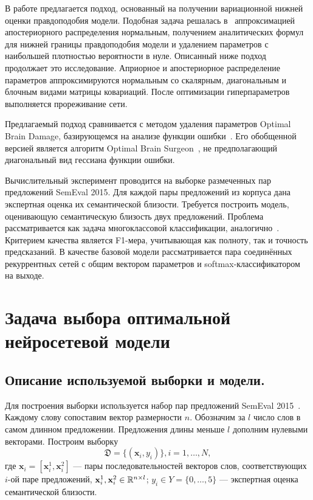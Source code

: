\documentclass[12pt, fleqn, unicode]{article}
\newcommand{\DD}{{\mathfrak{D}}}
\newcommand{\bx}{{\textbf{x}}}
\begin{document}
В работе предлагается подход, основанный на получении вариационной нижней оценки правдоподобия модели. Подобная задача решалась в~\cite{Graves} аппроксимацией апостериорного распределения нормальным, получением аналитических формул для нижней границы правдоподобия модели и удалением параметров с наибольшей плотностью вероятности в нуле. Описанный ниже подход продолжает это исследование. Априорное и апостериорное распределение параметров аппроксимируются нормальным со скалярным, диагональным и блочным видами матрицы ковариаций. После оптимизации гиперпараметров выполняется прореживание сети. 

Предлагаемый подход сравнивается с методом удаления параметров Optimal Brain Damage, базирующемся на анализе функции ошибки~\cite{OBD}. Его обобщенной версией является алгоритм Optimal Brain Surgeon~\cite{OBS}, не предполагающий диагональный вид гессиана функции ошибки.

Вычислительный эксперимент проводится на выборке размеченных пар предложений SemEval 2015. Для каждой пары предложений из корпуса дана экспертная оценка их семантической близости. Требуется построить модель, оценивающую семантическую близость двух предложений. Проблема рассматривается как задача многоклассовой классификации, аналогично~\cite{Sanborn}. Критерием качества является F1-мера, учитывающая как полноту, так и точность предсказаний.
В качестве базовой модели рассматривается пара соединённых рекуррентных сетей с общим вектором параметров и softmax-классификатором на выходе.

\newpage
\section{Задача выбора оптимальной нейросетевой модели}

\subsection{Описание используемой выборки и модели.}
Для построения выборки используется набор пар предложений SemEval 2015~\cite{SemEval2015}.
Каждому слову сопоставим вектор размерности $n$.
Обозначим за $l$ число слов в самом длинном предложении. Предложения длины меньше $l$ дополним нулевыми векторами. 
Построим выборку
$$ \DD = \{(\bx_i,y_i)\}, i = 1,\dots,N,$$
где $\bx_i = [\bx_i^1,\bx_i^2]$ --- пары последовательностей векторов слов, соответствующих $i$-ой паре предложений, $\bx_i^1, \bx_i^2 \in \RR^{n\times l}$;
$y_i \in Y = \{0,\dots,5\}$ --- экспертная оценка семантической близости. 
\end{document}
